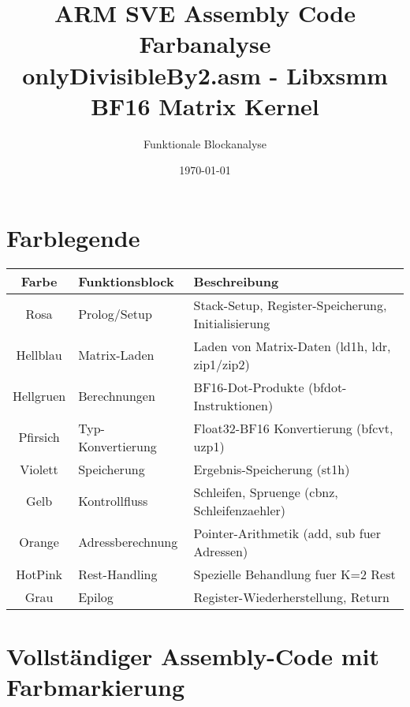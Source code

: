 \documentclass[11pt,a4paper]{article}
\title{ARM SVE Assembly Code Farbanalyse\\
\large onlyDivisibleBy2.asm - Libxsmm BF16 Matrix Kernel}
\author{Funktionale Blockanalyse}
\date{\today}
\begin{document}
\maketitle

\section{Farblegende}

\begin{table}[h!]
\centering
\begin{tabular}{|c|l|p{8cm}|}
\hline
\rowcolor{prologue} \textbf{Farbe} & \textbf{Funktionsblock} & \textbf{Beschreibung} \\
\hline
\rowcolor{prologue} Rosa & Prolog/Setup & Stack-Setup, Register-Speicherung, Initialisierung \\
\hline
\rowcolor{matrixload} Hellblau & Matrix-Laden & Laden von Matrix-Daten (ld1h, ldr, zip1/zip2) \\
\hline
\rowcolor{computation} Hellgruen & Berechnungen & BF16-Dot-Produkte (bfdot-Instruktionen) \\
\hline
\rowcolor{conversion} Pfirsich & Typ-Konvertierung & Float32-BF16 Konvertierung (bfcvt, uzp1) \\
\hline
\rowcolor{storage} Violett & Speicherung & Ergebnis-Speicherung (st1h) \\
\hline
\rowcolor{control} Gelb & Kontrollfluss & Schleifen, Spruenge (cbnz, Schleifenzaehler) \\
\hline
\rowcolor{address} Orange & Adressberechnung & Pointer-Arithmetik (add, sub fuer Adressen) \\
\hline
\rowcolor{remainder} HotPink & Rest-Handling & Spezielle Behandlung fuer K=2 Rest \\
\hline
\rowcolor{epilogue} Grau & Epilog & Register-Wiederherstellung, Return \\
\hline
\end{tabular}
\end{table}

\section{Vollständiger Assembly-Code mit Farbmarkierung}
\end{document}
